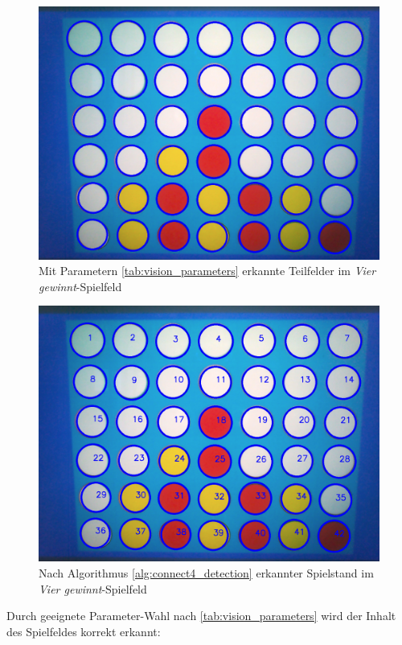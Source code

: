 \begin{figure}[!htbp]
    \centering
    \includegraphics[width=12cm]{bilder/connect4_circles.png}
    \caption[\textit{Vier gewinnt} Kreise]{Mit Parametern \ref{tab:vision_parameters} erkannte Teilfelder im \textit{Vier gewinnt}-Spielfeld}
    \label{fig:connect4_contours}
\end{figure}

\begin{figure}[!htbp]
    \centering
    \includegraphics[width=12cm]{bilder/connect4_result.png}
    \caption[Ausgewertetes \textit{Vier gewinnt}-Spielfeld]{Nach Algorithmus \vref{alg:connect4_detection} erkannter Spielstand im \textit{Vier gewinnt}-Spielfeld}
    \label{fig:connect4_result}
\end{figure}

Durch geeignete Parameter-Wahl nach \vref{tab:vision_parameters} wird der Inhalt des Spielfeldes korrekt erkannt:\\

